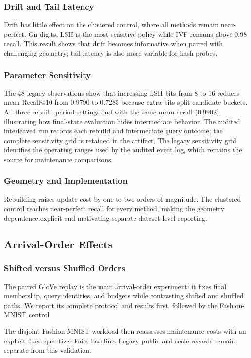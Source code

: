 \subsubsection{Drift and Tail Latency}
Drift has little effect on the clustered control, where all methods remain near-perfect.
On digits, LSH is the most sensitive policy while IVF remains above 0.98 recall. This
result shows that drift becomes informative when paired with challenging geometry; tail
latency is also more variable for hash probes.
\subsubsection{Parameter Sensitivity}
The 48 legacy observations show that increasing LSH bits from 8 to 16 reduces mean
Recall@10 from 0.9790 to 0.7285 because extra bits split candidate buckets. All three
rebuild-period settings end with the same mean recall (0.9902), illustrating how
final-state evaluation hides intermediate behavior. The audited interleaved run records
each rebuild and intermediate query outcome; the complete sensitivity grid is retained
in the artifact.
The legacy sensitivity grid identifies the operating ranges used by the audited event
log, which remains the source for maintenance comparisons.
\subsubsection{Geometry and Implementation}
Rebuilding raises update cost by one to two orders of magnitude. The clustered control
reaches near-perfect recall for every method, making the geometry dependence explicit
and motivating separate dataset-level reporting.

\subsection{Arrival-Order Effects}
\subsubsection{Shifted versus Shuffled Orders}
The paired GloVe replay is the main arrival-order experiment: it fixes final membership,
query identities, and budgets while contrasting shifted and shuffled paths. We report
its complete protocol and results first, followed by the Fashion-MNIST control.

The disjoint Fashion-MNIST workload then reassesses maintenance costs with an explicit
fixed-quantizer Faiss baseline. Legacy public and scale records remain separate from
this validation.

